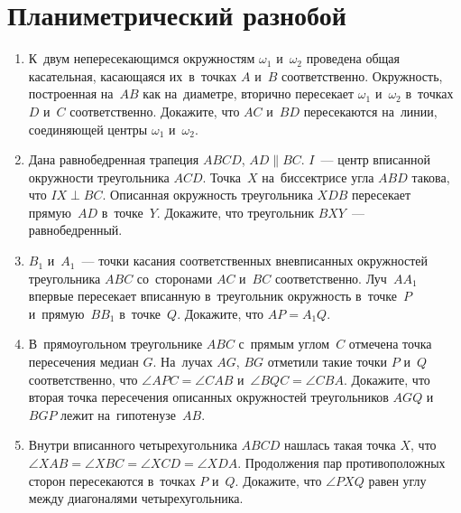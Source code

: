 
\section*{Планиметрический разнобой}


\begin{enumerate}

\item
К~двум непересекающимся окружностям $\omega_1$ и~$\omega_2$ проведена общая
касательная, касающаяся их~в~точках $A$ и~$B$ соответственно.
Окружность, построенная на~$AB$ как на~диаметре, вторично пересекает
$\omega_1$ и~$\omega_2$ в~точках $D$ и~$C$ соответственно.
Докажите, что $AC$ и~$BD$ пересекаются на~линии, соединяющей центры
$\omega_1$ и~$\omega_2$.

\item
Дана равнобедренная трапеция $ABCD$, $AD \parallel BC$.
$I$~— центр вписанной окружности треугольника $ACD$.
Точка~$X$ на~биссектрисе угла $ABD$ такова, что $IX \perp BC$.
Описанная окружность треугольника $XDB$ пересекает прямую~$AD$ в~точке~$Y$.
Докажите, что треугольник $BXY$~— равнобедренный.

\item
$B_1$ и~$A_1$~— точки касания соответственных вневписанных окружностей
треугольника $ABC$ со~сторонами $AC$ и~$BC$ соответственно.
Луч~$A A_1$ впервые пересекает вписанную в~треугольник окружность в~точке~$P$
и~прямую~$B B_1$ в~точке~$Q$.
Докажите, что $AP = A_1 Q$.

\item
В~прямоугольном треугольнике $ABC$ с~прямым углом~$C$ отмечена точка
пересечения медиан $G$.
На~лучах $AG$, $BG$ отметили такие точки $P$ и~$Q$ соответственно, что
$\angle APC = \angle CAB$ и~$\angle BQC = \angle CBA$.
Докажите, что вторая точка пересечения описанных окружностей треугольников
$AGQ$ и~$BGP$ лежит на~гипотенузе~$AB$.

\item
Внутри вписанного четырехугольника $ABCD$ нашлась такая точка $X$, что
$\angle XAB = \angle XBC = \angle XCD = \angle XDA$.
Продолжения пар противоположных сторон пересекаются в~точках $P$ и~$Q$.
Докажите, что $\angle PXQ$ равен углу между диагоналями четырехугольника.


\end{enumerate}
